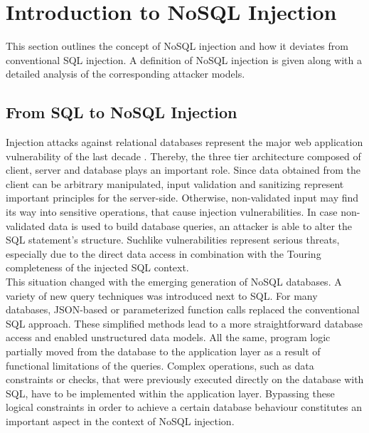 \chapter{Introduction to NoSQL Injection}
\label{cha:intro_to_nosql_injection}
This section outlines the concept of NoSQL injection and how it deviates from conventional SQL injection. A definition of NoSQL injection is given along with a detailed analysis of the corresponding attacker models.

\section{From SQL to NoSQL Injection}
\label{sec:fromSQLtoNoSQLinjection}
Injection attacks against relational databases represent the major web application vulnerability of the last decade \cite{OWASP:2013b}. Thereby, the three tier architecture composed of client, server and database plays an important role. Since data obtained from the client can be arbitrary manipulated, input validation and sanitizing represent important principles for the server-side. Otherwise, non-validated input may find its way into sensitive operations, that cause injection vulnerabilities. In case non-validated data is used to build database queries, an attacker is able to alter the SQL statement's structure. Suchlike vulnerabilities represent serious threats, especially due to the direct data access in combination with the Touring completeness of the injected SQL context.\\ 

This situation changed with the emerging generation of NoSQL databases. A variety of new query techniques was introduced next to SQL. For many databases, JSON-based or parameterized function calls replaced the conventional SQL approach. These simplified methods lead to a more straightforward database access and enabled unstructured data models. All the same, program logic partially moved from the database to the application layer as a result of functional limitations of the queries. Complex operations, such as data constraints or checks, that were previously executed directly on the database with SQL, have to be implemented within the application layer. Bypassing these logical constraints in order to achieve a certain database behaviour constitutes an important aspect in the context of NoSQL injection. \\ 

